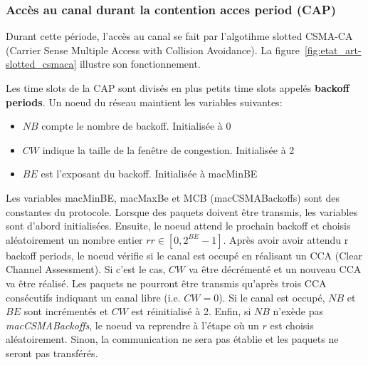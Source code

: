 \subsubsection*{Accès au canal durant la contention acces period (CAP)}
  Durant cette période, l'accès au canal se fait par l'algotihme slotted CSMA-CA
  (Carrier Sense Multiple Access with Collision Avoidance). La figure~\ref{fig:etat_art-slotted_csmaca}
  illustre son fonctionnement.

  Les time slots de la CAP sont divisés en plus petits time slots appelés \textbf{backoff periods}.
  Un noeud du réseau maintient les variables suivantes:
  \begin{itemize}
    \item $NB$ compte le nombre de backoff. Initialisée à 0
    \item $CW$ indique la taille de la fenêtre de congestion. Initialisée à 2
    \item $BE$ est l'exposant du backoff. Initialisée à macMinBE
  \end{itemize}

  Les variables macMinBE, macMaxBe et MCB (macCSMABackoffs) sont des constantes du protocole.
  Lorsque des paquets doivent être transmis, les variables sont d'abord initialisées.
  Ensuite, le noeud attend le prochain backoff et choisis aléatoirement un nombre entier
  $r r \in [0, 2^{BE}-1]$. Après avoir avoir attendu r backoff periods, le noeud vérifie
  si le canal est occupé en réalisant un CCA (Clear Channel Assessment).
  Si c'est le cas, $CW$ va être décrémenté et un nouveau CCA va être réalisé.
  Les paquets ne pourront être transmis qu'après trois CCA consécutifs indiquant un canal libre (i.e. $CW = 0$).
  Si le canal est occupé, $NB$ et $BE$ sont incrémentés et $CW$ est réinitialisé à 2.
  Enfin, si $NB$ n'exède pas \textit{macCSMABackoffs}, le noeud va reprendre à l'étape où un
  $r$ est choisis aléatoirement. Sinon, la communication ne sera pas établie et les paquets
  ne seront pas transférés.


